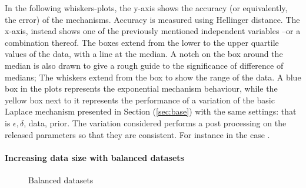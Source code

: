 \documentclass[sigconf, anonymous]{acmart}
\begin{document}
\noindent In the following whiskers-plots, the y-axis shows the accuracy (or equivalently, the error) of the mechanisms.
Accuracy is measured using Hellinger distance. The x-axis, instead shows  one of the previously mentioned
independent variables --or a combination thereof.
The boxes extend from the lower to the upper quartile values of the data, with a line at the median. A notch on the box around the median
is also drawn to give a rough guide to the significance of difference of medians;
The whiskers extend from the box to show the range of the data. 
A blue box in the plots represents the exponential mechanism behaviour,
while the yellow box next to it represents the performance of a variation of the
basic Laplace mechanism presented in Section (\ref{sec:base}) with the same settings: that is $\epsilon, \delta$, data, prior.
The variation considered performs a post processing on the released parameters so that they
are consistent. For instance in the case .
\paragraph{Increasing data size with balanced datasets}
\label{subsubsec_vs_datasize}

\begin{figure}[ht]
\begin{center}
\centering
\caption{Balanced datasets}
\label{fig_vs_datasize}
\end{center}
\end{figure}
\end{document}
